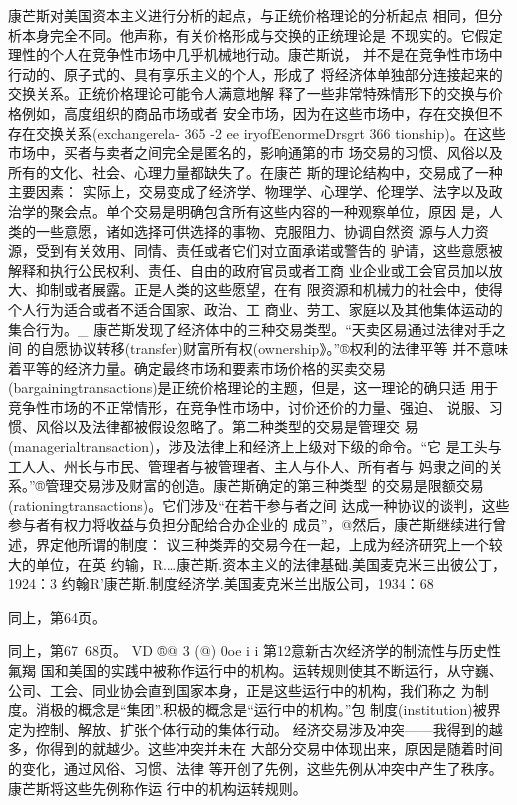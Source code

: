 康芒斯对美国资本主义进行分析的起点，与正统价格理论的分析起点
相同，但分析本身完全不同。他声称，有关价格形成与交换的正统理论是
不现实的。它假定理性的个人在竞争性市场中几乎机械地行动。康芒斯说，
并不是在竞争性市场中行动的、原子式的、具有享乐主义的个人，形成了
将经济体单独部分连接起来的交换关系。正统价格理论可能令人满意地解
释了一些非常特殊情形下的交换与价格例如，高度组织的商品市场或者
安全市场，因为在这些市场中，存在交换但不存在交换关系(exchangerela-
365
-2
ee
iryofEenormeDrsgrt
366
tionship)。在这些市场中，买者与卖者之间完全是匿名的，影响通第的市
场交易的习惯、风俗以及所有的文化、社会、心理力量都缺失了。在康芒
斯的理论结构中，交易成了一种主要因素：
实际上，交易变成了经济学、物理学、心理学、伦理学、法字以及政
治学的聚会点。单个交易是明确包含所有这些内容的一种观察单位，原因
是，人类的一些意愿，诸如选择可供选择的事物、克服阻力、协调自然资
源与人力资源，受到有关效用、同情、责任或者它们对立面承诺或警告的
驴请，这些意愿被解释和执行公民权利、责任、自由的政府官员或者工商
业企业或工会官员加以放大、抑制或者展露。正是人类的这些愿望，在有
限资源和机械力的社会中，使得个人行为适合或者不适合国家、政治、工
商业、劳工、家庭以及其他集体运动的集合行为。_
康芒斯发现了经济体中的三种交易类型。“天卖区易通过法律对手之间
的自愿协议转移(transfer)财富所有权(ownership》。”®权利的法律平等
并不意味着平等的经济力量。确定最终市场和要素市场价格的买卖交易
(bargainingtransactions)是正统价格理论的主题，但是，这一理论的确只适
用于竞争性市场的不正常情形，在竞争性市场中，讨价还价的力量、强迫、
说服、习惯、风俗以及法律都被假设忽略了。第二种类型的交易是管理交
易(managerialtransaction)，涉及法律上和经济上上级对下级的命令。“它
是工头与工人人、州长与市民、管理者与被管理者、主人与仆人、所有者与
妈隶之间的关系。”®管理交易涉及财富的创造。康芒斯确定的第三种类型
的交易是限额交易(rationingtransactions)。它们涉及“在若干参与者之间
达成一种协议的谈判，这些参与者有权力将收益与负担分配给合办企业的
成员”，@然后，康芒斯继续进行曾述，界定他所谓的制度：
议三种类弄的交易今在一起，上成为经济研究上一个较大的单位，在英
约输，R.…康芒斯.资本主义的法律基础.美国麦克米三出彼公丁，1924：3
约翰R'康芒斯.制度经济学.美国麦克米兰出版公司，1934：68

同上，第64页。

同上，第67~68页。
VD
®@
3
(@)
0oe
i
i
第12意新古次经济学的制流性与历史性氟羯
国和美国的实践中被称作运行中的机构。运转规则使其不断运行，从守巍、
公司、工会、同业协会直到国家本身，正是这些运行中的机构，我们称之
为制度。消极的概念是“集团”.积极的概念是“运行中的机构。”包
制度(institution)被界定为控制、解放、扩张个体行动的集体行动。
经济交易涉及冲突——我得到的越多，你得到的就越少。这些冲突并未在
大部分交易中体现出来，原因是随着时间的变化，通过风俗、习惯、法律
等开创了先例，这些先例从冲突中产生了秩序。康芒斯将这些先例称作运
行中的机构运转规则。

